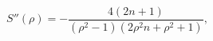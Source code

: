 \begin{equation}
S''(\rho)=-\frac{4(2n+1)}{(\rho^2-1)(2\rho^{2}n+\rho^{2}+1)}\label{secder},
\end{equation}

